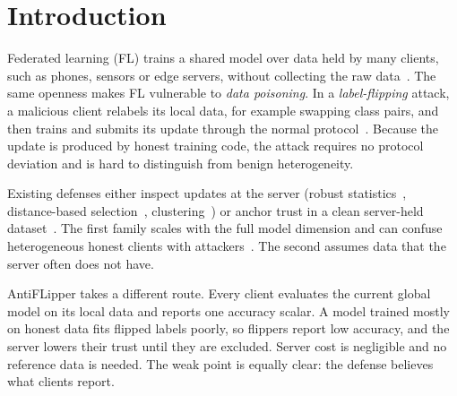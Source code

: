 \documentclass[conference]{IEEEtran}
\begin{document}
\section{Introduction}
Federated learning (FL) trains a shared model over data held by many clients, such as phones, sensors or edge servers, without collecting the raw data~\cite{fedavg-pmlr-v54-mcmahan17a,kairouz2021advances}. The same openness makes FL vulnerable to \emph{data poisoning}. In a \emph{label-flipping} attack, a malicious client relabels its local data, for example swapping class pairs, and then trains and submits its update through the normal protocol~\cite{biggio2011support,tolpegin2020data}. Because the update is produced by honest training code, the attack requires no protocol deviation and is hard to distinguish from benign heterogeneity.

Existing defenses either inspect updates at the server (robust statistics~\cite{yin2018byzantine}, distance-based selection~\cite{NIPS2017_f4b9ec30}, clustering~\cite{nguyen2022flame,tolpegin2020data,jebreel2024lfighter}) or anchor trust in a clean server-held dataset~\cite{cao2020fltrust,li2023hscs}. The first family scales with the full model dimension and can confuse heterogeneous honest clients with attackers~\cite{fung2020limitations}. The second assumes data that the server often does not have.

AntiFLipper takes a different route. Every client evaluates the current global model on its local data and reports one accuracy scalar. A model trained mostly on honest data fits flipped labels poorly, so flippers report low accuracy, and the server lowers their trust until they are excluded. Server cost is negligible and no reference data is needed. The weak point is equally clear: the defense believes what clients report.
\end{document}
